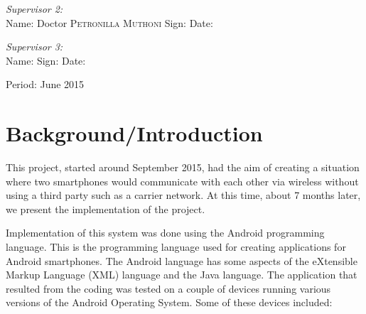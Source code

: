 \documentclass[12pt,svgnames,smaller]{article} %
\begin{document}
\begin{titlepage}
		\begin{minipage}{1.0\textwidth}
			\begin{flushleft} \large
				\emph{Supervisor 2:} \\
				Name: Doctor \textsc{Petronilla Muthoni} Sign: \hrulefill Date: \hrulefill
			\end{flushleft}
		\end{minipage}
		
		\begin{minipage}{1.0\textwidth}
			\begin{flushleft} \large
				\emph{Supervisor 3:} \\
				Name: \hrulefill Sign: \hrulefill Date: \hrulefill
			\end{flushleft}
		\end{minipage}
		
		\vfill
		
		
		\begin{center}
			{\large Period: June 2015}
		\end{center}
	\end{titlepage}
	
	
	\clearpage

	\tableofcontents
	\clearpage
				
	
	\section{\textbf{Background/Introduction}}
	
	This project, started around September 2015, had the aim of creating a situation where two smartphones would communicate with each other via wireless without using a third party such as a carrier network. At this time, about 7 months later, we present the implementation of the project.
	
	Implementation of this system was done using the Android programming language. This is the programming language used for creating applications for Android smartphones. The  Android language has some aspects of the eXtensible Markup Language (XML) language and the Java language. 
	The application that resulted from the coding was tested on a couple of devices running various versions of the Android Operating System. Some of these devices included:
	
\end{document}
